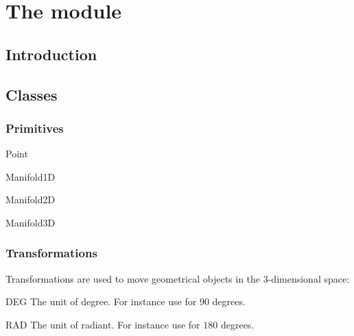 \chapter{The module \pycad}
\label{PYCAD CHAP}



\section{Introduction}


\section{\pycad Classes}

\subsection{Primitives}

\begin{classdesc}{Point}{}

\end{classdesc}

\begin{classdesc}{Manifold1D}{}

\end{classdesc}

\begin{classdesc}{Manifold2D}{}

\end{classdesc}

\begin{classdesc}{Manifold3D}{}

\end{classdesc}

\subsection{Transformations}

Transformations are used to move geometrical objects in the 3-dimensional space:

\begin{datadesc}{DEG}
The unit of degree. For instance use  for $90$ degrees.
\end{datadesc}

\begin{datadesc}{RAD}
The unit of radiant. For instance use  for $180$ degrees.
\end{datadesc}

